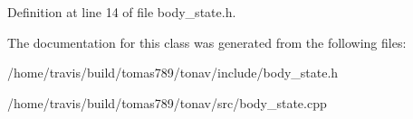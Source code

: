 Definition at line 14 of file body\-\_\-state.\-h.



The documentation for this class was generated from the following files\-:\begin{DoxyCompactItemize}
\item 
/home/travis/build/tomas789/tonav/include/body\-\_\-state.\-h\item 
/home/travis/build/tomas789/tonav/src/body\-\_\-state.\-cpp\end{DoxyCompactItemize}
